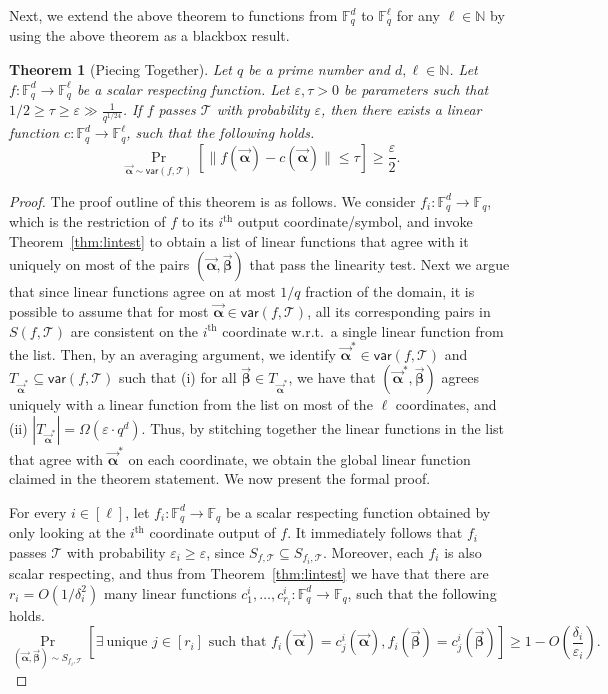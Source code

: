 \documentclass[11pt]{article}
\newcommand{\F}{\mathbb{F}}
\renewcommand{\ge}{ \geqslant}
\renewcommand{\le}{ \leqslant}
\newtheorem{theorem}{Theorem}[section]
\renewcommand{\epsilon}{\varepsilon}
\newcommand{\alphab}{\vec{\bm{\alpha}}}
\newcommand{\betab}{\vec{\bm{\beta}}}
\newcommand{\var}{\mathsf{var}}
\renewcommand{\kappa}{\tau}
\begin{document}
Next, we extend the above theorem to  functions from $\F_q^d$ to $\F_q^\ell$ for any $\ell\in\mathbb{N}$ by using the above theorem as a blackbox result.  

\begin{theorem}[Piecing Together]\label{thm:piecing}
Let $q$ be a prime number and $d,\ell\in \mathbb{N}$. 
Let $f:\F_q^d\to\F_q^{\ell}$ be a scalar respecting function. 
Let $\epsilon, \kappa > 0$ be parameters such that 
$1/2\ge \kappa \ge \epsilon \gg  \frac{1}{q^{1/24}}$. 
If $f$  passes $\mathcal{T}$ with probability $\varepsilon$, then there exists a \emph{linear} function $c:\F_q^d\to\F_q^{\ell}$, such that the following holds.
$$
\underset{\alphab\sim \var(f,\mathcal{T}) }{\Pr}\left[\|f(\alphab)-c(\alphab)\|\le \kappa \right]\ge \frac{\varepsilon}{2}.
$$ 
\end{theorem} 
\begin{proof}
	The proof outline of this theorem is as follows. We consider $f_i:\F_q^d\to\F_q$, which is the restriction of $f$ to its $i^{\text{th}}$ output coordinate/symbol, and invoke Theorem~\ref{thm:lintest} to obtain a list of linear functions that agree with it uniquely on most of the pairs $(\alphab,\betab)$ that pass the linearity test. Next we argue that since linear functions agree on at most $1/q$ fraction of the domain, it is possible to assume that for most $\alphab\in \var(f,\mathcal{T})$, all its corresponding pairs in $S(f,\mathcal{T})$ are consistent on the $i^{\text{th}}$  coordinate w.r.t.\ a single linear function from the list. Then, by an averaging argument, we identify $\alphab^*\in \var(f,\mathcal{T})$ and $T_{\alphab^*}\subseteq \var(f,\mathcal{T})$ such that (i) for all $\betab\in T_{\alphab^*}$, we have that $(\alphab^*,\betab)$ agrees uniquely with a linear function from the list on most of the $\ell$ coordinates, and (ii) $|T_{\alphab^*} |=\Omega(\varepsilon\cdot  q^d)$. Thus, by stitching together the linear functions in the list that agree with $\alphab^*$ on each coordinate, we obtain the global linear function claimed in the theorem statement.  We now present the formal proof.
	
	
	 For every $i\in[\ell]$, let $f_i:\F_q^d\to\F_q$ be a scalar respecting function obtained by only looking at the $i^{\text{th}}$ coordinate output of $f$. It immediately follows that  
	$f_i$ passes $\mathcal{T}$ with probability $\varepsilon_i\ge \varepsilon$, since $S_{f,\mathcal{T}}\subseteq S_{f_i,\mathcal{T}}$. Moreover, each $f_i$ is also scalar respecting, and thus from Theorem~\ref{thm:lintest} we have that there are  $r_i = O(1/\delta_i^2)$ many linear functions $c_1^i,\ldots ,c_{r_i}^i:\F_q^d\to\F_q$,  such that the following holds.
	$$
	\underset{ (\alphab, \betab) \sim S_{f_i,\mathcal{T}} }{\Pr}\left[\exists\ \text{unique } j\in[r_i] \text{ such that }f_i(\alphab)=c_j^i(\alphab),
	f_i(\betab)=c_j^i(\betab) \right]\ge 1- O\left(\frac{\delta_i}{\epsilon_i}\right).
	$$
	

\end{proof}
\end{document}
